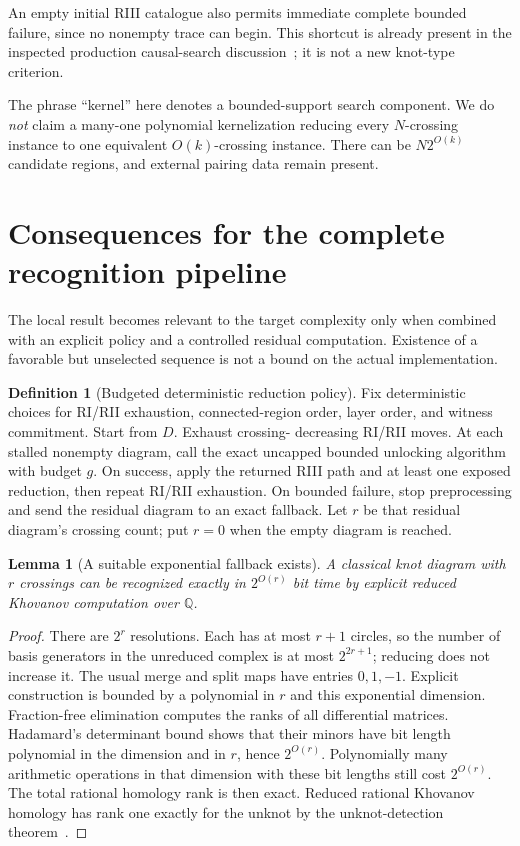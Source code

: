 \documentclass[11pt]{article}
\newtheorem{lemma}[theorem]{Lemma}
\theoremstyle{definition}
\newtheorem{definition}[theorem]{Definition}
\begin{document}
An empty initial RIII catalogue also permits immediate complete bounded
failure, since no nonempty trace can begin. This shortcut is already
present in the inspected production causal-search discussion~\cite{repo-causal};
it is not a new knot-type criterion.

The phrase ``kernel'' here denotes a bounded-support search component.
We do \emph{not} claim a many-one polynomial kernelization reducing every
$N$-crossing instance to one equivalent $O(k)$-crossing instance. There can
be $N2^{O(k)}$ candidate regions, and external pairing data remain present.

\section{Consequences for the complete recognition pipeline}
\label{sec:pipeline}

The local result becomes relevant to the target complexity only when
combined with an explicit policy and a controlled residual computation.
Existence of a favorable but unselected sequence is not a bound on the
actual implementation.

\begin{definition}[Budgeted deterministic reduction policy]
Fix deterministic choices for RI/RII exhaustion, connected-region order,
layer order, and witness commitment. Start from $D$. Exhaust crossing-
decreasing RI/RII moves. At each stalled nonempty diagram, call the exact
uncapped bounded unlocking algorithm with budget $g$. On success, apply
the returned RIII path and at least one exposed reduction, then repeat
RI/RII exhaustion. On bounded failure, stop preprocessing and send the
residual diagram to an exact fallback. Let $r$ be that residual diagram's
crossing count; put $r=0$ when the empty diagram is reached.
\end{definition}

\begin{lemma}[A suitable exponential fallback exists]
\label{lem:fallback}
A classical knot diagram with $r$ crossings can be recognized exactly in
$2^{O(r)}$ bit time by explicit reduced Khovanov computation over
$\mathbb Q$.
\end{lemma}

\begin{proof}
There are $2^r$ resolutions. Each has at most $r+1$ circles, so the
number of basis generators in the unreduced complex is at most
$2^{2r+1}$; reducing does not increase it. The usual merge and split maps
have entries $0,1,-1$. Explicit construction is bounded by a polynomial
in $r$ and this exponential dimension. Fraction-free elimination computes
the ranks of all differential matrices. Hadamard's determinant bound
shows that their minors have bit length polynomial in the dimension
and in $r$, hence $2^{O(r)}$. Polynomially many arithmetic operations
in that dimension with these bit lengths still cost $2^{O(r)}$.
The total rational homology rank is then exact. Reduced rational
Khovanov homology has rank one exactly for the unknot by the
unknot-detection theorem~\cite{km}.
\end{proof}
\end{document}

